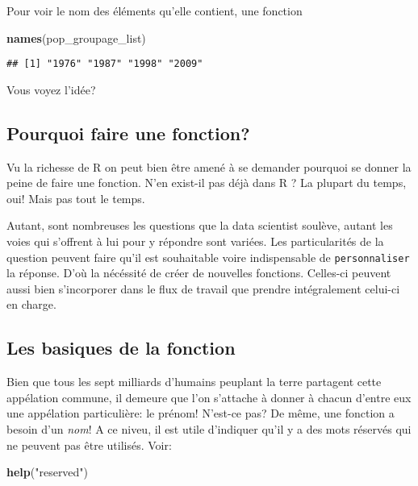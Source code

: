 \documentclass[]{book}
\newenvironment{Shaded}{\begin{snugshade}}{\end{snugshade}}
\newcommand{\KeywordTok}[1]{\textcolor[rgb]{0.13,0.29,0.53}{\textbf{#1}}}
\newcommand{\StringTok}[1]{\textcolor[rgb]{0.31,0.60,0.02}{#1}}
\newcommand{\NormalTok}[1]{#1}
\begin{document}
Pour voir le nom des éléments qu'elle contient, une fonction

\begin{Shaded}
\begin{Highlighting}[]
\KeywordTok{names}\NormalTok{(pop_groupage_list)}
\end{Highlighting}
\end{Shaded}

\begin{verbatim}
## [1] "1976" "1987" "1998" "2009"
\end{verbatim}

Vous voyez l'idée?

\subsection{Pourquoi faire une
fonction?}\label{pourquoi-faire-une-fonction}

Vu la richesse de R on peut bien être amené à se demander pourquoi se
donner la peine de faire une fonction. N'en exist-il pas déjà dans R ?
La plupart du temps, oui! Mais pas tout le temps.

Autant, sont nombreuses les questions que la data scientist soulève,
autant les voies qui s'offrent à lui pour y répondre sont variées. Les
particularités de la question peuvent faire qu'il est souhaitable voire
indispensable de \texttt{personnaliser} la réponse. D'où la nécéssité de
créer de nouvelles fonctions. Celles-ci peuvent aussi bien s'incorporer
dans le flux de travail que prendre intégralement celui-ci en charge.

\subsection{Les basiques de la
fonction}\label{les-basiques-de-la-fonction}

Bien que tous les sept milliards d'humains peuplant la terre partagent
cette appélation commune, il demeure que l'on s'attache à donner à
chacun d'entre eux une appélation particulière: le prénom! N'est-ce pas?
De même, une fonction a besoin d'un \emph{nom}! A ce niveu, il est utile
d'indiquer qu'il y a des mots réservés qui ne peuvent pas être utilisés.
Voir:

\begin{Shaded}
\begin{Highlighting}[]
\KeywordTok{help}\NormalTok{(}\StringTok{"reserved"}\NormalTok{)}
\end{Highlighting}
\end{Shaded}
\end{document}
